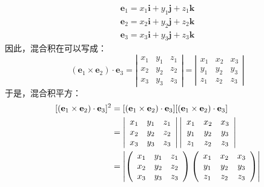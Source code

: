 \begin{equation}
\begin{aligned}
        \boldsymbol{e}_1 = x_1 \boldsymbol{i} + y_1 \boldsymbol{j} + z_1 \boldsymbol{k} \\
    \boldsymbol{e}_2 = x_2 \boldsymbol{i} + y_2 \boldsymbol{j} + z_2 \boldsymbol{k} \\
    \boldsymbol{e}_3 = x_3 \boldsymbol{i} + y_3 \boldsymbol{j} + z_3 \boldsymbol{k} 
\end{aligned}
\end{equation}
因此，混合积在可以写成：
\begin{equation}
    (\boldsymbol{e}_1 \times \boldsymbol{e}_2) \cdot \boldsymbol{e}_3 = \left| \begin{array}{ccc}
        x_1 & y_1 & z_1  \\
        x_2 & y_2 & z_2  \\
        x_3 & y_3 & z_3
    \end{array}\right| = \left| \begin{array}{ccc}
        x_1 & x_2 & x_3  \\
        y_1 & y_2 & y_3  \\
        z_1 & z_2 & z_3
    \end{array}\right|
\end{equation}
于是，混合积平方：
\begin{equation}
    \begin{aligned}
        \relax[(\mathbf{e}_1 \times \mathbf{e}_2 ) \cdot \mathbf{e}_3]^2 &= [(\mathbf{e}_1 \times \mathbf{e}_2 ) \cdot \mathbf{e}_3][(\mathbf{e}_1 \times \mathbf{e}_2 ) \cdot \mathbf{e}_3]\\
            & = \left| \begin{array}{ccc}
        x_1 & y_1 & z_1  \\
        x_2 & y_2 & z_2  \\
        x_3 & y_3 & z_3
    \end{array}\right|\left| \begin{array}{ccc}
        x_1 & x_2 & x_3  \\
        y_1 & y_2 & y_3  \\
        z_1 & z_2 & z_3
    \end{array}\right|\\
        &= \left| \left(\begin{array}{ccc}
        x_1 & y_1 & z_1  \\
        x_2 & y_2 & z_2  \\
        x_3 & y_3 & z_3
    \end{array} \right) \left(\begin{array}{ccc}
        x_1 & x_2 & x_3  \\
        y_1 & y_2 & y_3  \\
        z_1 & z_2 & z_3
    \end{array}\right)\right|
    \end{aligned}
\end{equation}
